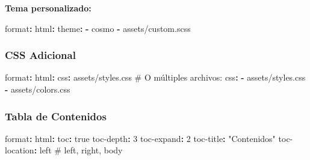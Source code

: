 \documentclass[
  doc,
  floatsintext,
  longtable,
  a4paper,
  nolmodern,
  notxfonts,
  notimes,
  12pt,
  colorlinks=true,linkcolor=blue,citecolor=blue,urlcolor=blue]{apa7}
\newenvironment{Shaded}{\begin{snugshade}}{\end{snugshade}}
\newcommand{\AttributeTok}[1]{\textcolor[rgb]{0.40,0.45,0.13}{#1}}
\newcommand{\CharTok}[1]{\textcolor[rgb]{0.13,0.47,0.30}{#1}}
\newcommand{\CommentTok}[1]{\textcolor[rgb]{0.37,0.37,0.37}{#1}}
\newcommand{\DecValTok}[1]{\textcolor[rgb]{0.68,0.00,0.00}{#1}}
\newcommand{\FunctionTok}[1]{\textcolor[rgb]{0.28,0.35,0.67}{#1}}
\newcommand{\KeywordTok}[1]{\textcolor[rgb]{0.00,0.23,0.31}{\textbf{#1}}}
\newcommand{\StringTok}[1]{\textcolor[rgb]{0.13,0.47,0.30}{#1}}
\begin{document}
\textbf{Tema personalizado:}

\begin{Shaded}
\begin{Highlighting}[]
\FunctionTok{format}\KeywordTok{:}
\AttributeTok{  }\FunctionTok{html}\KeywordTok{:}
\AttributeTok{    }\FunctionTok{theme}\KeywordTok{:}
\AttributeTok{      }\KeywordTok{{-}}\AttributeTok{ cosmo}
\AttributeTok{      }\KeywordTok{{-}}\AttributeTok{ assets/custom.scss}
\end{Highlighting}
\end{Shaded}

\subsubsection{CSS Adicional}\label{css-adicional}

\begin{Shaded}
\begin{Highlighting}[]
\FunctionTok{format}\KeywordTok{:}
\AttributeTok{  }\FunctionTok{html}\KeywordTok{:}
\AttributeTok{    }\FunctionTok{css}\KeywordTok{:}\AttributeTok{ assets/styles.css}
\CommentTok{    \# O múltiples archivos:}
\AttributeTok{    }\FunctionTok{css}\KeywordTok{:}
\AttributeTok{      }\KeywordTok{{-}}\AttributeTok{ assets/styles.css}
\AttributeTok{      }\KeywordTok{{-}}\AttributeTok{ assets/colors.css}
\end{Highlighting}
\end{Shaded}

\subsubsection{Tabla de Contenidos}\label{tabla-de-contenidos}

\begin{Shaded}
\begin{Highlighting}[]
\FunctionTok{format}\KeywordTok{:}
\AttributeTok{  }\FunctionTok{html}\KeywordTok{:}
\AttributeTok{    }\FunctionTok{toc}\KeywordTok{:}\AttributeTok{ }\CharTok{true}
\AttributeTok{    }\FunctionTok{toc{-}depth}\KeywordTok{:}\AttributeTok{ }\DecValTok{3}
\AttributeTok{    }\FunctionTok{toc{-}expand}\KeywordTok{:}\AttributeTok{ }\DecValTok{2}
\AttributeTok{    }\FunctionTok{toc{-}title}\KeywordTok{:}\AttributeTok{ }\StringTok{"Contenidos"}
\AttributeTok{    }\FunctionTok{toc{-}location}\KeywordTok{:}\AttributeTok{ left}\CommentTok{               \# left, right, body}
\end{Highlighting}
\end{Shaded}
\end{document}
